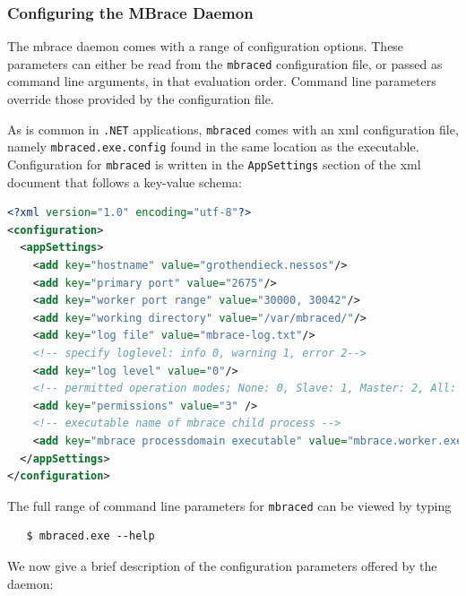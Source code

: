 \documentclass[9pt,a4paper]{article}
\newcommand{\mbrace}{mbrace}
\newcommand{\TitularMbrace}{MBrace}
\newcommand{\dotnet}{\texttt{\hbox{.}NET}}
\begin{document}
\subsubsection*{Configuring the \TitularMbrace{} Daemon}

The \mbrace{} daemon comes with a range of configuration options.
These parameters can either be read from the \texttt{mbraced} configuration file, 
or passed as command line arguments, in that evaluation order.
Command line parameters override those provided by the configuration file.

As is common in \dotnet{} applications, \texttt{mbraced} comes with an xml
configuration file, namely \texttt{mbraced.exe.config} found in the same location 
as the executable. Configuration for \texttt{mbraced} is written in the 
\texttt{AppSettings} section of the xml document that follows a key-value 
schema:
\begin{lstlisting}[language=Xml]
<?xml version="1.0" encoding="utf-8"?>
<configuration>
  <appSettings>
    <add key="hostname" value="grothendieck.nessos"/>
    <add key="primary port" value="2675"/>
    <add key="worker port range" value="30000, 30042"/>
    <add key="working directory" value="/var/mbraced/"/>
    <add key="log file" value="mbrace-log.txt"/>
    <!-- specify loglevel: info 0, warning 1, error 2-->
    <add key="log level" value="0"/>
    <!-- permitted operation modes; None: 0, Slave: 1, Master: 2, All: 3 -->
    <add key="permissions" value="3" />
    <!-- executable name of mbrace child process -->
    <add key="mbrace processdomain executable" value="mbrace.worker.exe"/>
  </appSettings>
</configuration>
\end{lstlisting}
The full range of command line parameters for \texttt{mbraced} can be viewed by typing
\begin{verbatim}
   $ mbraced.exe --help
\end{verbatim}
%
We now give a brief description of the configuration parameters offered by the daemon:
\end{document}
